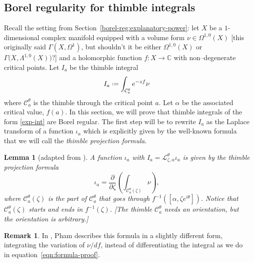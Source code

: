 \documentclass{article}
\newcommand{\C}{\mathbb{C}}
\newcommand*{\defeq}{\mathrel{\vcenter{\baselineskip0.5ex \lineskiplimit0pt
                     \hbox{\scriptsize.}\hbox{\scriptsize.}}}%
                     =}
\newcommand{\laplace}{\mathcal{L}}
\theoremstyle{definition}
\newtheorem{remark}[definition]{Remark}
\theoremstyle{plain}
\newtheorem{lemma}[definition]{Lemma}
\newenvironment{todo}{\color{Coral}}{\color{black}}
\newenvironment{draft}{\color{SlateBlue}}{\color{black}}
\begin{document}
\subsection{Borel regularity for thimble integrals}\label{borel-reg-thimble}
%
\begin{draft}Recall the setting from Section~\ref{borel-reg:explanatory-power}: let $X$ be a $1$-dimensional complex manifold equipped with a volume form $\nu \in \Omega^{1,0}(X)$ \begin{todo}[this originally said $\Gamma(X,\Omega^1)$, but shouldn't it be either $\Omega^{1,0}(X)$ or $\Gamma\big(X, \Lambda^{1,0} (X)\big)$?]\end{todo} and a holomorphic function $f\colon X\to\C$ with non--degenerate critical points. Let $I_a$ be the thimble integral 
\begin{equation}\label{exp-int}
I_a \defeq \int_{\mathcal{C}_a^\theta} e^{-zf} \nu
\end{equation}
where $\mathcal{C}_a^\theta$ is the thimble through the critical point $a$. Let $\alpha$ be the associated critical value, $f(a)$. In this section, we will prove that thimble integrals of the form \eqref{exp-int} are Borel regular. The first step will be to rewrite $I_a$ as the Laplace transform of a function $\iota_a$ which is explicitly given by the well-known formula that we will call the \textit{thimble projection formula}.\end{draft}
\begin{lemma}[adapted from {\cite[Section~3.3]{pham}}]\label{lem:thimble_proj_formula-proof}
A function $\iota_a$ with $I_a = \laplace_{\zeta, \alpha}^\theta \iota_a$ is given by the {\em thimble projection formula}
\begin{equation}\label{eqn:formula-proof}
    \iota_a = \frac{\partial}{\partial \zeta} \left( \int_{\mathcal{C}_a^\theta(\zeta)}\nu \right),
\end{equation}
where $\mathcal{C}_a^\theta(\zeta)$ is the part of $\mathcal{C}_a^\theta$ that goes through $f^{-1}([\alpha,\zeta e^{i\theta}])$. Notice that $\mathcal{C}_a^\theta(\zeta)$ starts and ends in $f^{-1}(\zeta)$. \begin{todo}[The thimble $\mathcal{C}_a^\theta$ needs an orientation, but the orientation is arbitrary.]\end{todo}
\end{lemma}
\begin{remark}
In \cite{pham}, Pham describes this formula in a slightly different form, integrating the variation of $\nu/df$, instead of differentiating the integral as we do in equation~\eqref{eqn:formula-proof}.
\end{remark}
\end{document}

